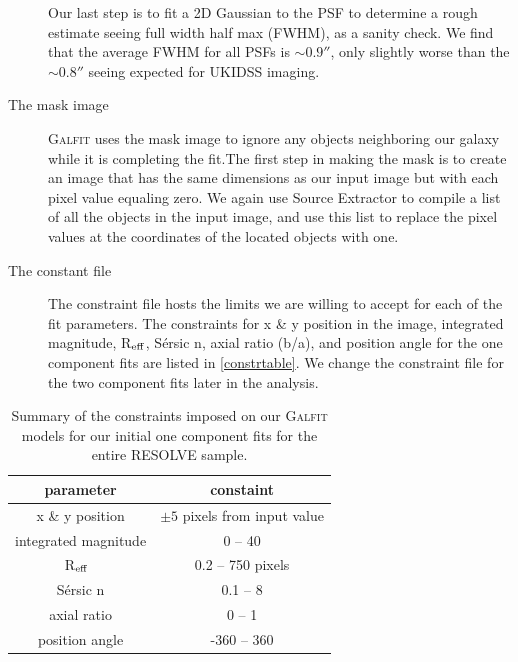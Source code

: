 \documentclass[iop,apj]{emulateapj}
\newcommand{\Reff}{R$_{\rm eff}$}
\begin{document}
\begin{description}
{\begin{enumerate}
\end{enumerate}

\noindent Our last step is to fit a 2D Gaussian to the PSF to determine a rough estimate seeing full width half max (FWHM), as a sanity check. We find that the average FWHM for all PSFs is $\sim 0.9''$, only slightly worse than the $\sim 0.8''$ seeing expected for UKIDSS imaging.}

\item[The mask image]{\textsc{Galfit} uses the mask image to ignore any objects neighboring our galaxy while it is completing the fit.The first step in making the mask is to create an image that has the same dimensions as our input image but with each pixel value equaling zero. We again use Source Extractor to compile a list of all the objects in the input image, and  use this list to replace the pixel values at the coordinates of the located objects with one.}

\item[The constant file]{The constraint file hosts the limits we are willing to accept for each of the fit parameters. The constraints for x \& y position in the image, integrated magnitude, \Reff, S\'ersic n, axial ratio (b/a), and position angle for the one component fits are listed in \autoref{constrtable}. We change the constraint file for the two component fits later in the analysis.}

\end{description}

\begin{table}[htdp]
\begin{center}
\begin{tabular}{cc} \hline
parameter & constaint  \\ \hline
x \& y position & $\pm5$ pixels from input value \\
integrated magnitude & 0 -- 40 \\ 
\Reff\ & 0.2 -- 750 pixels \\ 
S\'ersic n & 0.1 -- 8 \\ 
axial ratio & 0 -- 1 \\
position angle & -360 -- 360 \\ \hline
\end{tabular}
\end{center}
\caption{Summary of the constraints imposed on our \textsc{Galfit} models for our initial one component fits for the entire RESOLVE sample.}
\label{constrtable}
\end{table}%
\end{document}
